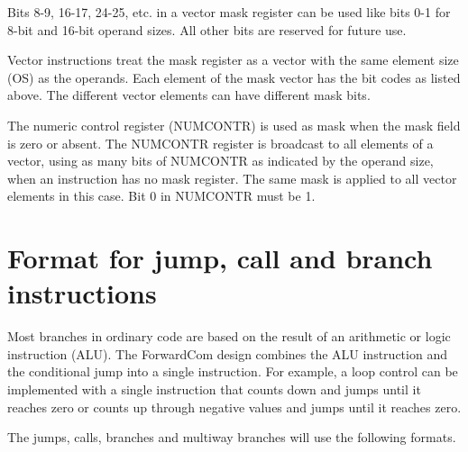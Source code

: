 \documentclass[forwardcom.tex]{subfiles}
\begin{document}
Bits 8-9, 16-17, 24-25, etc. in a vector mask register can be used like bits 0-1 for 8-bit and 16-bit operand sizes. All other bits are reserved for future use.
\vspace{2mm}

Vector instructions treat the mask register as a vector with the same element size (OS) as the operands. Each element of the mask vector has the bit codes as listed above. The different vector elements can have different mask bits.
\vspace{2mm}

The numeric control register (NUMCONTR) is used as mask when the mask field is zero or absent. The NUMCONTR register is broadcast to all elements of a vector, using as many bits of NUMCONTR as indicated by the operand size, when an instruction has no mask register. 
The same mask is applied to all vector elements in this case. 
Bit 0 in NUMCONTR must be 1.

\section{Format for jump, call and branch instructions}
Most branches in ordinary code are based on the result of an arithmetic or logic instruction (ALU). The ForwardCom design combines the ALU instruction and the conditional jump into a single instruction. For example, a loop control can be implemented with a single instruction that counts down and jumps until it reaches zero or counts up through negative values and jumps until it reaches zero.
\vspace{2mm}

The jumps, calls, branches and multiway branches will use the following formats.
\end{document}
